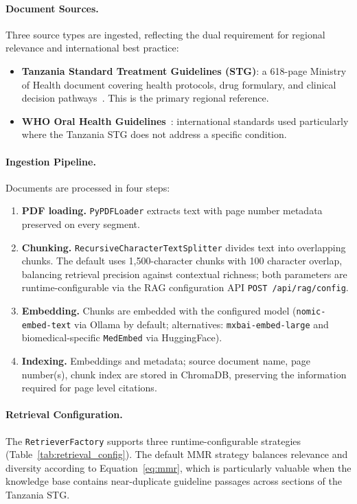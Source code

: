 \documentclass[12pt,a4paper]{report}
\begin{document}
	\paragraph{Document Sources.}
	Three source types are ingested, reflecting the dual requirement for regional relevance and
	international best practice:
	\begin{itemize}
		\item \textbf{Tanzania Standard Treatment Guidelines (STG)}: a 618-page Ministry of
		Health document covering health protocols, drug formulary, and clinical
		decision pathways~\cite{tanzania_oral_health_policy}. This is the primary regional
		reference.
		\item \textbf{WHO Oral Health Guidelines}~\cite{who_oral_health}: international standards
		used particularly where the Tanzania STG does not address a specific condition.
		
	\end{itemize}
	
	\paragraph{Ingestion Pipeline.}
	Documents are processed in four steps:
	\begin{enumerate}
		\item \textbf{PDF loading.} \texttt{PyPDFLoader} extracts text with page number metadata
		preserved on every segment.
		\item \textbf{Chunking.} \texttt{RecursiveCharacterTextSplitter} divides text into
		overlapping chunks. The default uses 1{,}500-character chunks with 100 character
		overlap, balancing retrieval precision against contextual richness; both parameters are
		runtime-configurable via the RAG configuration API \texttt{POST /api/rag/config}.
		\item \textbf{Embedding.} Chunks are embedded with the configured model
		(\texttt{nomic-embed-text} via Ollama by default; alternatives: \texttt{mxbai-embed-large}
		and biomedical-specific \texttt{MedEmbed} via HuggingFace).
		\item \textbf{Indexing.} Embeddings and metadata; source document name, page number(s),
		chunk index are stored in ChromaDB, preserving the information required for page level
		citations.
	\end{enumerate}
	
	\paragraph{Retrieval Configuration.}
	The \texttt{RetrieverFactory} supports three runtime-configurable strategies
	(Table~\ref{tab:retrieval_config}). The default MMR strategy balances relevance and
	diversity according to Equation~\eqref{eq:mmr}, which is particularly valuable when the
	knowledge base contains near-duplicate guideline passages across sections of the Tanzania
	STG.
	
\end{document}
